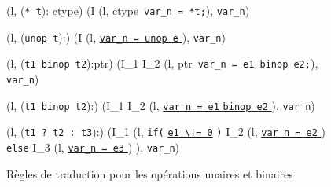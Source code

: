 \begin{figure*}[h!]
  \scriptsize{
    {
      {(l, (\mbox{\lstinline'* t'}): ctype) 
        (I \concat (l, ctype~\mbox{\lstinline'var_n = *t;'}),
        \mbox{\lstinline'var_n'})}
    }

    {
      {(l, (\mbox{\lstinline'unop t'}):) 
        (I
        \concat (l, \underline{\Zinit \mbox{\lstinline'var_n = unop e'} \Zclear}
        \semicolon),
        \mbox{\lstinline'var_n'})}
    }

    {
      {(l, (\mbox{\lstinline't1 binop t2'}):ptr) 
        (I_1 \concat I_2
        \concat (l, ptr~\mbox{\lstinline'var_n = e1 binop e2;'}),
        \mbox{\lstinline'var_n'})}
    }

    {
      {(l, (\mbox{\lstinline't1 binop t2'}):) 
        (I_1 \concat I_2 \concat (l,
        \underline{\Zinit \mbox{\lstinline'var_n = e1'} \Zclear
          \mbox{\lstinline'binop e2'} \Zclear}
        \semicolon
        ), \mbox{\lstinline'var_n'})}
    }

    {
      {
        (l, (\mbox{\lstinline't1 ? t2 : t3'}):)
        (I_1
        \concat (l,
        \mbox{\lstinline'if('}
        \underline{\mbox{\lstinline'e1'}\Zclear \mbox{\lstinline' \!= 0'}}
        \mbox{\lstinline')'} \bopen
        I_2
        \concat
        (l, \underline{\Zinit \mbox{\lstinline'var_n = e2'} \Zclear}
        \semicolon )
        \bclose
        \mbox{\lstinline'else'} \bopen
        I_3
        \concat
        (l, \underline{\Zinit \mbox{\lstinline'var_n = e3'} \Zclear}
        \semicolon )
        \bclose ),
        \mbox{\lstinline'var_n'})
      }
    }
  }
  \caption{Règles de traduction pour les opérations unaires et binaires}
  \label{fig:op}
\end{figure*}
